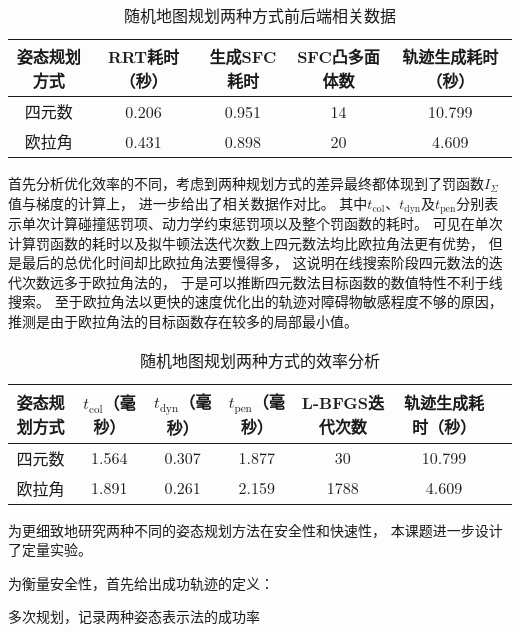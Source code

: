 \begin{table}[htbp]
    \caption{随机地图规划两种方式前后端相关数据\label{tab:data_of_2_scenarios_in_random_map}}
    \vspace{0.5em}\centering\wuhao
    \begin{tabular}{ccccc}
    \toprule[1.5pt]
    姿态规划方式 & RRT耗时（秒） & 生成SFC耗时 & SFC凸多面体数 & 轨迹生成耗时（秒）\\
    \midrule[1pt]
    四元数 & 0.206 & 0.951 & 14 & 10.799 \\
    欧拉角 & 0.431 & 0.898 & 20 & 4.609 \\
    \bottomrule[1.5pt]
    \end{tabular}
\end{table}

首先分析优化效率的不同，考虑到两种规划方式的差异最终都体现到了罚函数$I_\Sigma$值与梯度的计算上，
进一步给出了相关数据作对比。
其中$t_{\text{col}}$、$t_{\text{dyn}}$及$t_{\text{pen}}$分别表示单次计算碰撞惩罚项、动力学约束惩罚项以及整个罚函数的耗时。
可见在单次计算罚函数的耗时以及拟牛顿法迭代次数上四元数法均比欧拉角法更有优势，
但是最后的总优化时间却比欧拉角法要慢得多，
这说明在线搜索阶段四元数法的迭代次数远多于欧拉角法的，
于是可以推断四元数法目标函数的数值特性不利于线搜索。
至于欧拉角法以更快的速度优化出的轨迹对障碍物敏感程度不够的原因，
推测是由于欧拉角法的目标函数存在较多的局部最小值。

\begin{table}[htbp]
    \caption{随机地图规划两种方式的效率分析\label{tab:analysis_of_efficiency_in_random_map_scenario}}
    \vspace{0.5em}\centering\wuhao
    \begin{tabular}{ccccccc}
    \toprule[1.5pt]
    姿态规划方式 & $t_{\text{col}}$（毫秒） & $t_{\text{dyn}}$（毫秒）& $t_{\text{pen}}$（毫秒）& L-BFGS迭代次数 & 轨迹生成耗时（秒）\\
    \midrule[1pt]
    四元数 & 1.564 & 0.307 & 1.877 & 30 & 10.799 \\
    欧拉角 & 1.891 & 0.261 & 2.159 & 1788 & 4.609 \\
    \bottomrule[1.5pt]
    \end{tabular}
\end{table}

为更细致地研究两种不同的姿态规划方法在安全性和快速性，
本课题进一步设计了定量实验。

为衡量安全性，首先给出成功轨迹的定义：

多次规划，记录两种姿态表示法的成功率

